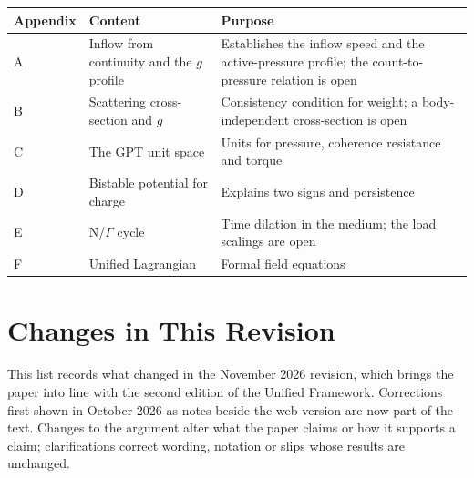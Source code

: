 \documentclass[12pt, a4paper]{article}
\begin{document}
\begin{center}
\begin{tabular}{|p{3cm}|p{5cm}|p{6cm}|}
\hline
\textbf{Appendix} & \textbf{Content} & \textbf{Purpose} \\
\hline
A & Inflow from continuity and the \( g \) profile & Establishes the inflow speed and the active-pressure profile; the count-to-pressure relation is open \\
\hline
B & Scattering cross-section and \( g \) & Consistency condition for weight; a body-independent cross-section is open \\
\hline
C & The GPT unit space & Units for pressure, coherence resistance and torque \\
\hline
D & Bistable potential for charge & Explains two signs and persistence \\
\hline
E & N/\(\Gamma\) cycle & Time dilation in the medium; the load scalings are open \\
\hline
F & Unified Lagrangian & Formal field equations \\
\hline
\end{tabular}
\end{center}

\section*{Changes in This Revision}

This list records what changed in the November 2026 revision, which brings the paper into line with the second edition of the Unified Framework. Corrections first shown in October 2026 as notes beside the web version are now part of the text. Changes to the argument alter what the paper claims or how it supports a claim; clarifications correct wording, notation or slips whose results are unchanged.
\end{document}
